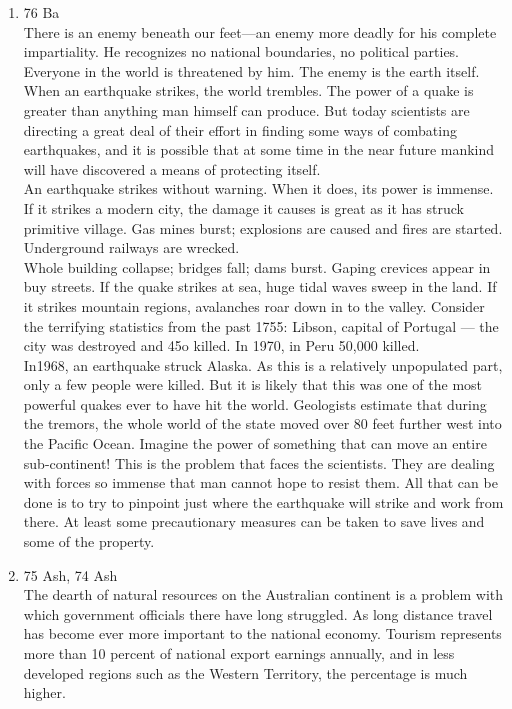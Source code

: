 \documentclass[12pt]{article}
\begin{document}
\begin{enumerate}
    \item 76 Ba\\
      There is an enemy beneath our feet—an enemy more deadly for his complete impartiality. He recognizes no national boundaries, no political parties. Everyone in the world is threatened by him. The enemy is the earth itself. When an earthquake strikes, the world trembles. The power of a quake is greater than anything man himself can produce. But today scientists are directing a great deal of their effort in finding some ways of combating earthquakes, and it is possible that at some time in the near future mankind will have discovered a means of protecting itself.\\

      An earthquake strikes without warning. When it does, its power is immense. If it strikes a modern city, the damage it causes is great as it has struck primitive village. Gas mines burst; explosions are caused and fires are started. Underground railways are wrecked.\\

      Whole building collapse; bridges fall; dams burst. Gaping crevices appear in buy streets. If the quake strikes at sea, huge tidal waves sweep in the land. If it strikes mountain regions, avalanches roar down in to the valley. Consider the terrifying statistics from the past 1755: Libson, capital of Portugal — the city was destroyed and 45o killed. In 1970, in Peru 50,000 killed.\\

      In1968, an earthquake struck Alaska. As this is a relatively unpopulated part, only a few people were killed. But it is likely that this was one of the most powerful quakes ever to have hit the world. Geologists estimate that during the tremors, the whole world of the state moved over 80 feet further west into the Pacific Ocean. Imagine the power of something that can move an entire sub-continent! This is the problem that faces the scientists. They are dealing with forces so immense that man cannot hope to resist them. All that can be done is to try to pinpoint just where the earthquake will strike and work from there. At least some precautionary measures can be taken to save lives and some of the property.

    \item 75 Ash, 74 Ash\\
      The dearth of natural resources on the Australian continent is a problem with which government officials there have long struggled. As long distance travel has become ever more important to the national economy. Tourism represents more than 10 percent of national export earnings annually, and in less developed regions such as the Western Territory, the percentage is much higher.\\


\end{enumerate}
\end{document}
